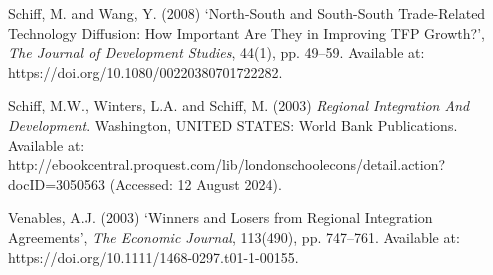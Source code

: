 Schiff, M. and Wang, Y. (2008) `North-South and South-South
Trade-Related Technology Diffusion: How Important Are They in Improving
TFP Growth?', \emph{The Journal of Development Studies}, 44(1), pp.
49--59. Available at: https://doi.org/10.1080/00220380701722282.

Schiff, M.W., Winters, L.A. and Schiff, M. (2003) \emph{Regional
Integration And Development}. Washington, UNITED STATES: World Bank
Publications. Available at:
http://ebookcentral.proquest.com/lib/londonschoolecons/detail.action?docID=3050563
(Accessed: 12 August 2024).

Venables, A.J. (2003) `Winners and Losers from Regional Integration
Agreements', \emph{The Economic Journal}, 113(490), pp. 747--761.
Available at: https://doi.org/10.1111/1468-0297.t01-1-00155.
